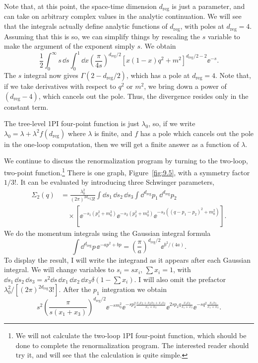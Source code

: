 Note that, at this point, the space-time dimension $d_{\mathrm{reg}}$ is just a
parameter, and can take on arbitrary complex values in the analytic
continuation. We will see that the integrals actually define analytic
functions of $d_{\mathrm{reg}}$, with poles at $d_{\mathrm{reg}}=4$.
Assuming that this is so, we can simplify things by rescaling the $s$ variable to
make the argument of the exponent simply $s$. We obtain
\[
  \frac{1}{2}\int_0^\infty s\,\dd s\int_0^1\dd x
  \left(\frac{\pi}{4s}\right)^{d_{\mathrm{reg}}/2}
  [x(1-x)q^2+m^2]^{d_{\mathrm{reg}}/2-2}\ee^{-s}.
\]
The $s$ integral now gives $\Gamma(2-d_{\mathrm{reg}}/2)$, which has a pole at
$d_{\mathrm{reg}}=4$. Note that, if we take derivatives with respect to $q^2$ or $m^2$, we
bring down a power of $(d_{\mathrm{reg}}-4)$, which cancels out the pole. Thus, the divergence
resides only in the constant term.

The tree-level 1PI four-point function is just $\lambda_0$, so, if we write
$\lambda_0=\lambda+\lambda^2f(d_{\mathrm{reg}})$ where $\lambda$ is finite, and $f$ has a pole
which cancels out the pole in the one-loop computation, then we will get a finite
answer as a function of $\lambda$.

We continue to discuss the renormalization program by turning to the two-loop,
two-point function.\footnote[10]{We will not calculate the two-loop 1PI four-point
function, which should be done to complete the renormalization program. The
interested reader should try it, and will see that the calculation is quite
simple.}
There is one graph, Figure~\ref{fig:9.5}, with a symmetry factor $1/3!$. It can
be evaluated by introducing three Schwinger parameters,
\[
  \begin{aligned}
  \Sigma_2(q)&=\frac{\lambda_0^2}{(2\pi)^{2d_{\mathrm{reg}}}3!}
  \int\dd s_1\,\dd s_2\,\dd s_3
  \int\dd^{d_{\mathrm{reg}}}p_1\,\dd^{d_{\mathrm{reg}}}p_2\\
  &\quad\times\left[\ee^{-s_1(p_1^2+m_0^2)}\ee^{-s_2(p_2^2+m_0^2)}
  \ee^{-s_3((q-p_1-p_2)^2+m_0^2)}\right].
  \end{aligned}
\]
We do the momentum integrals using the Gaussian integral formula
\[
  \int\dd^{d_{\mathrm{reg}}}p\,\ee^{-ap^2+bp}
  =\left(\frac{\pi}{a}\right)^{d_{\mathrm{reg}}/2}\ee^{b^2/(4a)}.
\]
To display the result, I will write the integrand as it appears after each
Gaussian integral. We will change variables to $s_i=sx_i$, $\sum x_i=1$, with
$\dd s_1\,\dd s_2\,\dd s_3=s^2\dd s\,\dd x_1\,\dd x_2\,\dd x_3
\delta(1-\sum x_i)$. I will also omit the prefactor
$\lambda_0^2/[(2\pi)^{2d_{\mathrm{reg}}}3!]$. After the $p_1$ integration we obtain
\[
  s^2\left(\frac{\pi}{s(x_1+x_3)}\right)^{d_{\mathrm{reg}}/2}
  \ee^{-sm_0^2}
  \ee^{-sp_2^2\frac{x_1x_2+x_2x_3+x_1x_3}{x_1+x_3}}
  \ee^{2sp_2q\frac{x_1x_3}{x_1+x_3}}
  \ee^{-sq^2\frac{x_1x_3}{x_1+x_3}}.
\]

